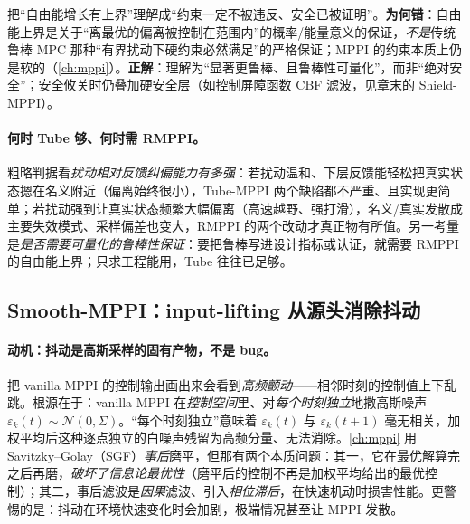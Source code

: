 \begin{pitfall}
把“自由能增长有上界”理解成“约束一定不被违反、安全已被证明”。\textbf{为何错}：自由能上界是关于“离最优的偏离被控制在范围内”的概率/能量意义的保证，\emph{不是}传统鲁棒 MPC 那种“有界扰动下硬约束必然满足”的严格保证；MPPI 的约束本质上仍是软的（\cref{ch:mppi}）。\textbf{正解}：理解为“显著更鲁棒、且鲁棒性可量化”，而非“绝对安全”；安全攸关时仍叠加硬安全层（如控制屏障函数 CBF 滤波，见章末的 Shield-MPPI）。
\end{pitfall}

\paragraph{何时 Tube 够、何时需 RMPPI。}
粗略判据看\emph{扰动相对反馈纠偏能力有多强}：若扰动温和、下层反馈能轻松把真实状态摁在名义附近（偏离始终很小），Tube-MPPI 两个缺陷都不严重、且实现更简单；若扰动强到让真实状态频繁大幅偏离（高速越野、强打滑），名义/真实发散成主要失效模式、采样偏差也变大，RMPPI 的两个改动才真正物有所值。另一考量是\emph{是否需要可量化的鲁棒性保证}：要把鲁棒写进设计指标或认证，就需要 RMPPI 的自由能上界；只求工程能用，Tube 往往已足够。

\subsection{Smooth-MPPI：input-lifting 从源头消除抖动}
\label{sec:mv-smooth}

\paragraph{动机：抖动是高斯采样的固有产物，不是 bug。}
把 vanilla MPPI 的控制输出画出来会看到\emph{高频颤动}——相邻时刻的控制值上下乱跳。根源在于：vanilla MPPI 在\emph{控制空间}里、对\emph{每个时刻独立}地撒高斯噪声 $\varepsilon_k(t)\sim\mathcal{N}(0,\Sigma)$。“每个时刻独立”意味着 $\varepsilon_k(t)$ 与 $\varepsilon_k(t{+}1)$ 毫无相关，加权平均后这种逐点独立的白噪声残留为高频分量、无法消除。\cref{ch:mppi} 用 Savitzky--Golay（SGF）\emph{事后}磨平，但那有两个本质问题：其一，它在最优解算完之后再磨，\emph{破坏了信息论最优性}（磨平后的控制不再是加权平均给出的最优控制）；其二，事后滤波是\emph{因果}滤波、引入\emph{相位滞后}，在快速机动时损害性能。更警惕的是：抖动在环境快速变化时会加剧，极端情况甚至让 MPPI 发散\cite{kim2022smooth}。

